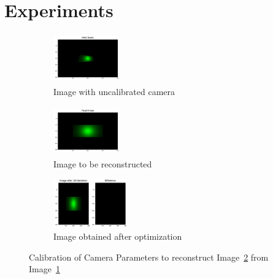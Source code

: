 \documentclass{juliacon}
\begin{document}
\section{Experiments}

\begin{figure}[!htb]
    \centering
    \begin{subfigure}[c]{0.26\textwidth}
        \centering
        \includegraphics[width=107px, height=80px]{images/camera/initial_guess_image.png}
        \caption{Image with uncalibrated camera}
        \label{fig:cam_guess}
    \end{subfigure}
    \hfill
    \begin{subfigure}[c]{0.26\textwidth}
        \centering          
        \includegraphics[width=107px, height=80px]{images/camera/target_image.png}
        \caption{Image to be reconstructed}
        \label{fig:cam_target}
    \end{subfigure}
    \centering
    \begin{subfigure}[c]{0.47\textwidth}
        \centering
        \includegraphics[width=\textwidth, height=80px]{images/camera/iter_120.png}
        \caption{Image obtained after optimization}
    \end{subfigure}
    \caption{Calibration of Camera Parameters to reconstruct Image~\ref{fig:cam_target} from Image~\ref{fig:cam_guess}}
    \label{fig:cam_invrender}
\end{figure}
\end{document}
